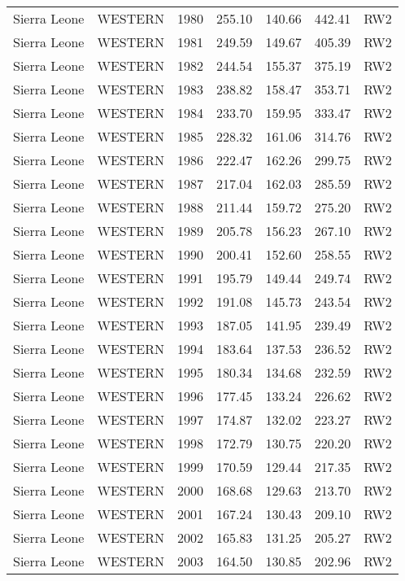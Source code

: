 \begin{longtable}{lllrrrl}
  Sierra Leone & WESTERN & 1980 & 255.10 & 140.66 & 442.41 & RW2 \\ 
  Sierra Leone & WESTERN & 1981 & 249.59 & 149.67 & 405.39 & RW2 \\ 
  Sierra Leone & WESTERN & 1982 & 244.54 & 155.37 & 375.19 & RW2 \\ 
  Sierra Leone & WESTERN & 1983 & 238.82 & 158.47 & 353.71 & RW2 \\ 
  Sierra Leone & WESTERN & 1984 & 233.70 & 159.95 & 333.47 & RW2 \\ 
  Sierra Leone & WESTERN & 1985 & 228.32 & 161.06 & 314.76 & RW2 \\ 
  Sierra Leone & WESTERN & 1986 & 222.47 & 162.26 & 299.75 & RW2 \\ 
  Sierra Leone & WESTERN & 1987 & 217.04 & 162.03 & 285.59 & RW2 \\ 
  Sierra Leone & WESTERN & 1988 & 211.44 & 159.72 & 275.20 & RW2 \\ 
  Sierra Leone & WESTERN & 1989 & 205.78 & 156.23 & 267.10 & RW2 \\ 
  Sierra Leone & WESTERN & 1990 & 200.41 & 152.60 & 258.55 & RW2 \\ 
  Sierra Leone & WESTERN & 1991 & 195.79 & 149.44 & 249.74 & RW2 \\ 
  Sierra Leone & WESTERN & 1992 & 191.08 & 145.73 & 243.54 & RW2 \\ 
  Sierra Leone & WESTERN & 1993 & 187.05 & 141.95 & 239.49 & RW2 \\ 
  Sierra Leone & WESTERN & 1994 & 183.64 & 137.53 & 236.52 & RW2 \\ 
  Sierra Leone & WESTERN & 1995 & 180.34 & 134.68 & 232.59 & RW2 \\ 
  Sierra Leone & WESTERN & 1996 & 177.45 & 133.24 & 226.62 & RW2 \\ 
  Sierra Leone & WESTERN & 1997 & 174.87 & 132.02 & 223.27 & RW2 \\ 
  Sierra Leone & WESTERN & 1998 & 172.79 & 130.75 & 220.20 & RW2 \\ 
  Sierra Leone & WESTERN & 1999 & 170.59 & 129.44 & 217.35 & RW2 \\ 
  Sierra Leone & WESTERN & 2000 & 168.68 & 129.63 & 213.70 & RW2 \\ 
  Sierra Leone & WESTERN & 2001 & 167.24 & 130.43 & 209.10 & RW2 \\ 
  Sierra Leone & WESTERN & 2002 & 165.83 & 131.25 & 205.27 & RW2 \\ 
  Sierra Leone & WESTERN & 2003 & 164.50 & 130.85 & 202.96 & RW2 \\ 

\end{longtable}
